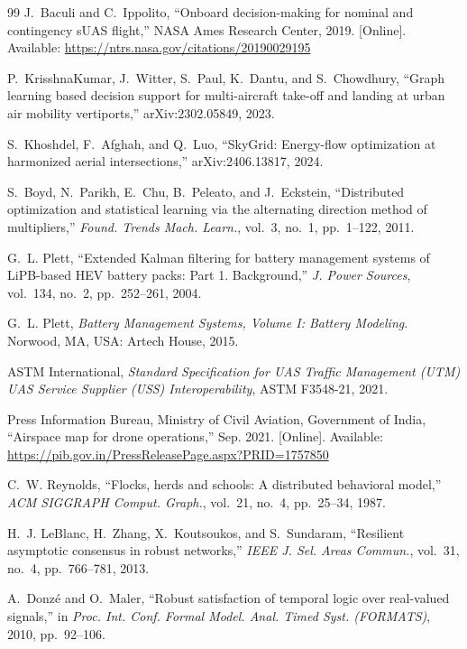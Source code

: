 \documentclass[journal]{IEEEtran}
\begin{document}
\begin{thebibliography}{99}
J.~Baculi and C.~Ippolito, ``Onboard decision-making for nominal and contingency sUAS flight,'' NASA Ames Research Center, 2019. [Online]. Available: \url{https://ntrs.nasa.gov/citations/20190029195}

P.~KrisshnaKumar, J.~Witter, S.~Paul, K.~Dantu, and S.~Chowdhury, ``Graph learning based decision support for multi-aircraft take-off and landing at urban air mobility vertiports,'' arXiv:2302.05849, 2023.

S.~Khoshdel, F.~Afghah, and Q.~Luo, ``SkyGrid: Energy-flow optimization at harmonized aerial intersections,'' arXiv:2406.13817, 2024.

S.~Boyd, N.~Parikh, E.~Chu, B.~Peleato, and J.~Eckstein, ``Distributed optimization and statistical learning via the alternating direction method of multipliers,'' \textit{Found. Trends Mach. Learn.}, vol.~3, no.~1, pp.~1--122, 2011.

G.~L. Plett, ``Extended Kalman filtering for battery management systems of LiPB-based HEV battery packs: Part 1. Background,'' \textit{J. Power Sources}, vol.~134, no.~2, pp.~252--261, 2004.

G.~L. Plett, \textit{Battery Management Systems, Volume I: Battery Modeling}. Norwood, MA, USA: Artech House, 2015.

ASTM International, \textit{Standard Specification for UAS Traffic Management (UTM) UAS Service Supplier (USS) Interoperability}, ASTM F3548-21, 2021.

Press Information Bureau, Ministry of Civil Aviation, Government of India, ``Airspace map for drone operations,'' Sep. 2021. [Online]. Available: \url{https://pib.gov.in/PressReleasePage.aspx?PRID=1757850}

C.~W. Reynolds, ``Flocks, herds and schools: A distributed behavioral model,'' \textit{ACM SIGGRAPH Comput. Graph.}, vol.~21, no.~4, pp.~25--34, 1987.

H.~J. LeBlanc, H.~Zhang, X.~Koutsoukos, and S.~Sundaram, ``Resilient asymptotic consensus in robust networks,'' \textit{IEEE J. Sel. Areas Commun.}, vol.~31, no.~4, pp.~766--781, 2013.

A.~Donz\'e and O.~Maler, ``Robust satisfaction of temporal logic over real-valued signals,'' in \textit{Proc. Int. Conf. Formal Model. Anal. Timed Syst. (FORMATS)}, 2010, pp.~92--106.


\end{thebibliography}
\end{document}
